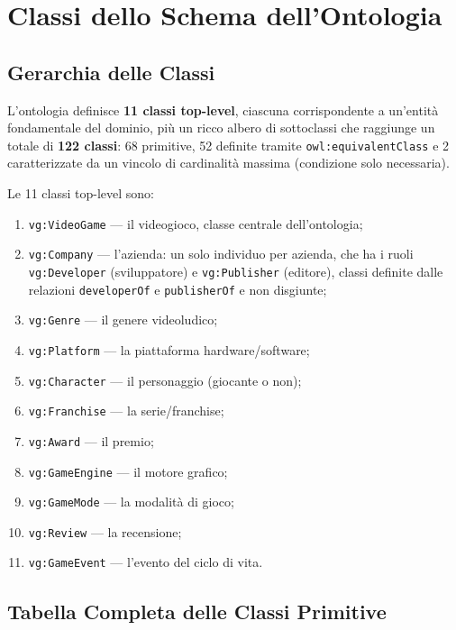 \section{Classi dello Schema dell'Ontologia}
\label{sec:tbox_classi}

\subsection{Gerarchia delle Classi}

L'ontologia definisce \textbf{11 classi top-level}, ciascuna corrispondente a
un'entit\`a fondamentale del dominio, pi\`u un ricco albero di sottoclassi che
raggiunge un totale di \textbf{122 classi}: 68 primitive, 52 definite tramite
\texttt{owl:equivalentClass} e 2 caratterizzate da un vincolo di cardinalit\`a massima
(condizione solo necessaria).

Le 11 classi top-level sono:
\begin{enumerate}[nosep]
  \item \texttt{vg:VideoGame} --- il videogioco, classe centrale dell'ontologia;
  \item \texttt{vg:Company} --- l'azienda: un solo individuo per azienda, che ha i ruoli
    \texttt{vg:Developer} (sviluppatore) e \texttt{vg:Publisher} (editore), classi definite dalle relazioni
    \texttt{developerOf} e \texttt{publisherOf} e non disgiunte;
  \item \texttt{vg:Genre} --- il genere videoludico;
  \item \texttt{vg:Platform} --- la piattaforma hardware/software;
  \item \texttt{vg:Character} --- il personaggio (giocante o non);
  \item \texttt{vg:Franchise} --- la serie/franchise;
  \item \texttt{vg:Award} --- il premio;
  \item \texttt{vg:GameEngine} --- il motore grafico;
  \item \texttt{vg:GameMode} --- la modalit\`a di gioco;
  \item \texttt{vg:Review} --- la recensione;
  \item \texttt{vg:GameEvent} --- l'evento del ciclo di vita.
\end{enumerate}

\subsection{Tabella Completa delle Classi Primitive}

